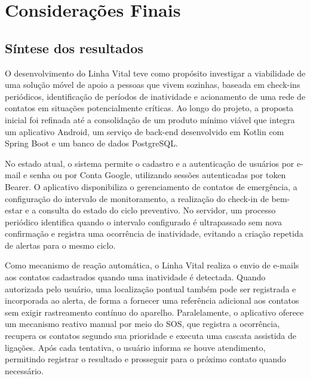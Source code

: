 
\chapter{Considerações Finais}

\section{Síntese dos resultados}

O desenvolvimento do Linha Vital teve como propósito investigar a viabilidade de uma solução móvel de apoio a pessoas que vivem sozinhas, baseada em check-ins periódicos, identificação de períodos de inatividade e acionamento de uma rede de contatos em situações potencialmente críticas. Ao longo do projeto, a proposta inicial foi refinada até a consolidação de um produto mínimo viável que integra um aplicativo Android, um serviço de back-end desenvolvido em Kotlin com Spring Boot e um banco de dados PostgreSQL.

No estado atual, o sistema permite o cadastro e a autenticação de usuários por e-mail e senha ou por Conta Google, utilizando sessões autenticadas por token Bearer. O aplicativo disponibiliza o gerenciamento de contatos de emergência, a configuração do intervalo de monitoramento, a realização do check-in de bem-estar e a consulta do estado do ciclo preventivo. No servidor, um processo periódico identifica quando o intervalo configurado é ultrapassado sem nova confirmação e registra uma ocorrência de inatividade, evitando a criação repetida de alertas para o mesmo ciclo.

Como mecanismo de reação automática, o Linha Vital realiza o envio de e-mails aos contatos cadastrados quando uma inatividade é detectada. Quando autorizada pelo usuário, uma localização pontual também pode ser registrada e incorporada ao alerta, de forma a fornecer uma referência adicional aos contatos sem exigir rastreamento contínuo do aparelho. Paralelamente, o aplicativo oferece um mecanismo reativo manual por meio do SOS, que registra a ocorrência, recupera os contatos segundo sua prioridade e executa uma cascata assistida de ligações. Após cada tentativa, o usuário informa se houve atendimento, permitindo registrar o resultado e prosseguir para o próximo contato quando necessário.

